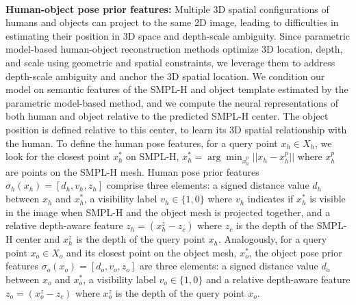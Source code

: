 \\\textbf{Human-object pose prior features:} Multiple 3D spatial configurations of humans and objects can project to the same 2D image, leading to difficulties in estimating their position in 3D space and depth-scale ambiguity. Since parametric model-based human-object reconstruction methods optimize 3D location, depth, and scale using geometric and spatial constraints, we leverage them to address depth-scale ambiguity and anchor the 3D spatial location. We condition our model on semantic features of the SMPL-H and object template estimated by the parametric model-based method, and we compute the neural representations of both human and object relative to the predicted SMPL-H center.  The object position is defined relative to this center, to learn its 3D spatial relationship with the human. To define the human pose features, for a query point $x_h \in X_h$, we look for the closest point $x_h^*$ on SMPL-H, \ie $x_h^* = \arg \min_{x_h^p} || x_h - x_h^p||$ where $x_h^p$ are points on the SMPL-H mesh. Human pose prior features $\sigma_h(x_h) = [d_h, v_h, z_h]$ comprise three elements: a signed distance value $d_h$ between $x_h$ and $x_h^*$, a visibility label $v_h \in \{1, 0\}$ where $v_h$ indicates if $x_h^*$ is visible in the image when SMPL-H and the object mesh is projected together, and a relative depth-aware feature $z_h = (x_h^z - z_c)$ where $z_c$ is the depth of the SMPL-H center and $x_h^z$ is the depth of the query point $x_h$. Analogously, for a query point $x_o \in X_o$ and its closest point on the object mesh, $x_o^*$, the object pose prior features $\sigma_o(x_o) = [d_o, v_o, z_o]$ are three elements: a signed distance value $d_o$ between $x_o$ and $x_o^*$, a visibility label $v_o \in \{1, 0\}$ and a relative depth-aware feature $z_o = (x_o^z - z_c)$ where $x_o^z$ is the depth of the query 
point $x_o$. 
%
